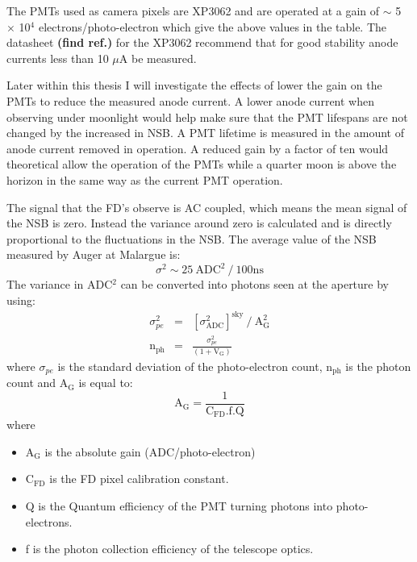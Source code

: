 The PMTs used as camera pixels are XP3062 and are operated at a gain of $\sim$ 5 $\times$ 10$^4$ electrons/photo-electron which give the above values in the table. The datasheet \textbf{(find ref.)} for the XP3062 recommend that for good stability anode currents less than 10 $\mu$A be measured. 
  


Later within this thesis I will investigate the effects of lower the gain on the PMTs to reduce the measured anode current. A lower anode current when observing under moonlight would help make sure that the PMT lifespans are not changed by the increased in NSB. A PMT lifetime is measured in the amount of anode current removed in operation. A reduced gain by a factor of ten would theoretical allow the operation of the PMTs while a quarter moon is above the horizon in the same way as the current PMT operation.  

The signal that the FD's observe is AC coupled, which means the mean signal of the NSB is zero. Instead the variance around zero is calculated and is directly proportional to the fluctuations in the NSB. The average value of the NSB measured by Auger at Malargue is:
\begin{equation}
\sigma^2 \sim 25 \ \mathrm{ADC}^2 \ / \ 100 \mathrm{ns}
\end{equation}
The variance in ADC$^2$ can be converted into photons seen at the aperture by using:
\begin{eqnarray}
\sigma^2_{pe} &=& [\sigma^2_{\mathrm{ADC}}]^{\mathrm{sky}} \ / \ \mathrm{A}^2_{\mathrm{G}} \label{eq:simgaPE} \\
\mathrm{n}_{\mathrm{ph}} &=& \frac{\sigma^2_{pe}}{(1 + \mathrm{V}_{\mathrm{G}})} \label{eq:numPhoton}
\end{eqnarray}
where $\sigma_{pe}$ is the standard deviation of the photo-electron count, n$_{\mathrm{ph}}$ is the photon count and A$_{\mathrm{G}}$ is equal to:
\begin{equation}\label{eq:abs_gain}
\mathrm{A}_{\mathrm{G}} = \frac{1}{\mathrm{C}_{\mathrm{FD}}.\mathrm{f}.\mathrm{Q}}
\end{equation}
where
\begin{itemize}
\item[] A$_{\mathrm{G}}$ is the absolute gain (ADC/photo-electron)
\item[] $\mathrm{C}_{\mathrm{FD}}$ is the FD pixel calibration constant.
\item[] Q is the Quantum efficiency of the PMT turning photons into photo-electrons.
\item[] f is the photon collection efficiency of the telescope optics.
\end{itemize}

